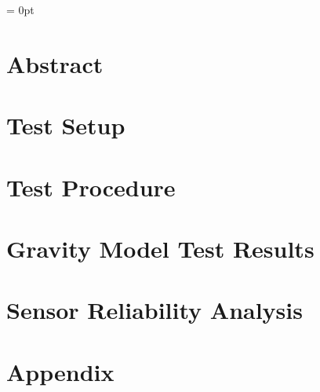 \documentclass[12pt]{article}
\begin{document}


\parindent = 0pt

\tableofcontents

\newpage

\section{Abstract}
\label{sec:abstract}


\newpage

\section{Test Setup}
\label{sec:testSetup}


\newpage

\section{Test Procedure}
\label{sec:testProcedure}



\newpage

\section{Gravity Model Test Results}
\label{sec:testResults}



\section{Sensor Reliability Analysis}
\label{sec:sensorReliability}



%
%

\newpage

\section{Appendix}
\label{sec:appendix}

\end{document}
